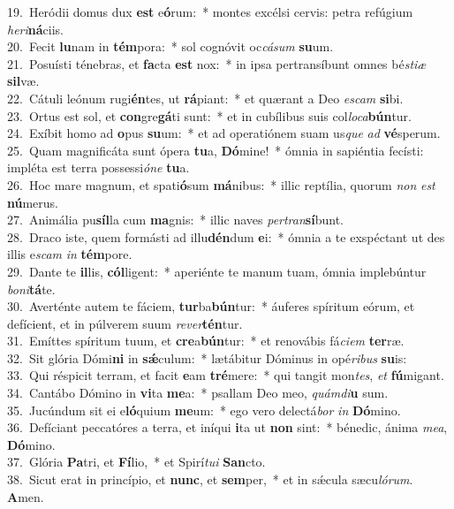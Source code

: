 {19.~}Heródii domus dux \textbf{est} e\textbf{ó}rum:~* montes excélsi cervis: petra refúgium \textit{he}\textit{ri}\textbf{ná}ciis.\\
{20.~}Fecit \textbf{lu}nam in \textbf{tém}pora:~* sol cognóvit oc\textit{cá}\textit{sum} \textbf{su}um.\\
{21.~}Posuísti ténebras, et \textbf{fa}cta \textbf{est} nox:~* in ipsa pertransíbunt omnes bé\textit{sti}\textit{æ} \textbf{sil}væ.\\
{22.~}Cátuli leónum rugi\textbf{én}tes, ut \textbf{rá}piant:~* et quærant a Deo \textit{e}\textit{scam} \textbf{si}bi.\\
{23.~}Ortus est sol, et \textbf{con}gre\textbf{gá}ti sunt:~* et in cubílibus suis col\textit{lo}\textit{ca}\textbf{bún}tur.\\
{24.~}Exíbit homo ad \textbf{o}pus \textbf{su}um:~* et ad operatiónem suam us\textit{que} \textit{ad} \textbf{vé}sperum.\\
{25.~}Quam magnificáta sunt ópera \textbf{tu}a, \textbf{Dó}mine!~* ómnia in sapiéntia fecísti: impléta est terra possessi\textit{ó}\textit{ne} \textbf{tu}a.\\
{26.~}Hoc mare magnum, et spati\textbf{ó}sum \textbf{má}nibus:~* illic reptília, quorum \textit{non} \textit{est} \textbf{nú}merus.\\
{27.~}Animália pu\textbf{síl}la cum \textbf{ma}gnis:~* illic naves \textit{per}\textit{tran}\textbf{sí}bunt.\\
{28.~}Draco iste, quem formásti ad illu\textbf{dén}dum \textbf{e}i:~* ómnia a te exspéctant ut des illis e\textit{scam} \textit{in} \textbf{tém}pore.\\
{29.~}Dante te \textbf{il}lis, \textbf{cól}ligent:~* aperiénte te manum tuam, ómnia implebúntur \textit{bo}\textit{ni}\textbf{tá}te.\\
{30.~}Averténte autem te fáciem, \textbf{tur}ba\textbf{bún}tur:~* áuferes spíritum eórum, et defícient, et in púlverem suum \textit{re}\textit{ver}\textbf{tén}tur.\\
{31.~}Emíttes spíritum tuum, et \textbf{cre}a\textbf{bún}tur:~* et renovábis fá\textit{ci}\textit{em} \textbf{ter}ræ.\\
{32.~}Sit glória Dómi\textbf{ni} in \textbf{sǽ}culum:~* lætábitur Dóminus in opé\textit{ri}\textit{bus} \textbf{su}is:\\
{33.~}Qui réspicit terram, et facit \textbf{e}am \textbf{tré}mere:~* qui tangit mon\textit{tes}, \textit{et} \textbf{fú}migant.\\
{34.~}Cantábo Dómino in \textbf{vi}ta \textbf{me}a:~* psallam Deo meo, \textit{quám}\textit{di}\textbf{u} sum.\\
{35.~}Jucúndum sit ei e\textbf{ló}quium \textbf{me}um:~* ego vero delectá\textit{bor} \textit{in} \textbf{Dó}mino.\\
{36.~}Defíciant peccatóres a terra, et iníqui \textbf{i}ta ut \textbf{non} sint:~* bénedic, ánima \textit{me}\textit{a}, \textbf{Dó}mino.\\
{37.~}Glória \textbf{Pa}tri, et \textbf{Fí}lio,~* et Spirí\textit{tu}\textit{i} \textbf{San}cto.\\
{38.~}Sicut erat in princípio, et \textbf{nunc}, et \textbf{sem}per,~* et in sǽcula sæcu\textit{ló}\textit{rum}. \textbf{A}men.\\
